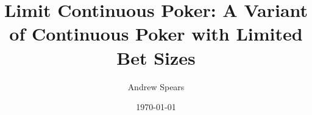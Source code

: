 \documentclass[a4paper,12pt]{article}
\title{Limit Continuous Poker: A Variant of Continuous Poker with Limited Bet Sizes}
\author{Andrew Spears}
\date{\today}
\theoremstyle{plain}
\theoremstyle{definition}
\begin{document}
\maketitle


\tableofcontents
\newpage










\pagebreak

\appendix


% 
% 



\pagebreak

 
\end{document}

